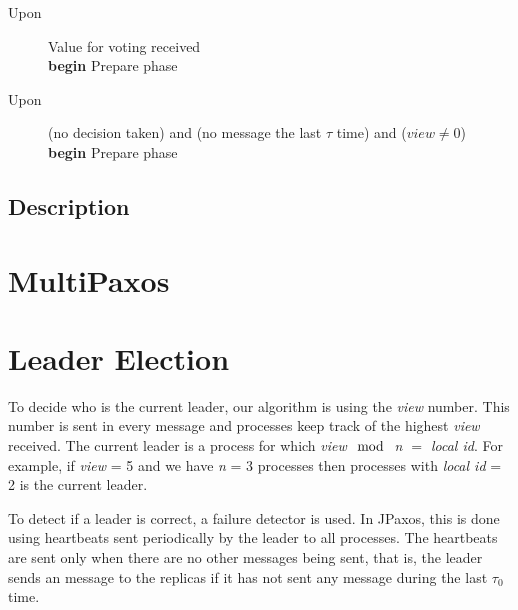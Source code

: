 \begin{table}
\begin{description}
 \item[Upon] Value for voting received \\
   \textbf{begin} Prepare phase

 \item[Upon] (no decision taken) and (no message the last $\tau$ time) and ($\textit{view} \neq 0$) \\
   \textbf{begin} Prepare phase

\end{description}
\end{table}



\subsection*{Description}


\section{MultiPaxos}%



\section{Leader Election}
\label{sec:leader_election}
\indent\par

To decide who is the current leader, our algorithm is using the \textit{view} number. This number is sent in every message and processes keep track of the highest \textit{view} received. The current leader is a process for which \textit{view $\mod$ n $=$ local id}. For example, if \textit{view} = 5 and we have \textit{n} = 3 processes then processes with \textit{local id} = 2 is the current leader.

To detect if a leader is correct, a failure detector is used. In JPaxos, this is done using heartbeats sent periodically by the leader to all processes. The heartbeats are sent only when there are no other messages being sent, that is, the leader sends an \alive message to the replicas if it has not sent any message during the last $\tau_0$ time.

